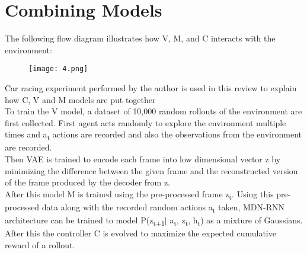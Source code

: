 \documentclass{article}
\begin{document}
\section{Combining Models}
The following flow diagram illustrates how V, M, and C interacts with the environment:
\begin{figure}[H]
  \texttt{[image: 4.png]}
\end{figure}
Car racing experiment performed by the author is used in this review to explain how C, V and M models are put together\\
To train the V model, a dataset of 10,000 random rollouts of the environment are first collected. First agent acts randomly to explore the environment multiple times and a\textsubscript{t} actions are recorded and also the observations from the environment are recorded.\\
Then VAE is trained to encode each frame into low dimensional vector z by minimizing the difference between the given frame and the reconstructed version of the frame produced by the decoder from z.\\
After this model M is trained using the pre-processed frame z\textsubscript{t}. Using this pre-processed data along with the recorded random actions a\textsubscript{t} taken, MDN-RNN architecture can be trained to model P(z\textsubscript{t+1}$\vert$ a\textsubscript{t}, z\textsubscript{t}, h\textsubscript{t}) as a mixture of Gaussians.\\
After this the controller C is evolved to maximize the expected cumulative reward of a rollout.
\end{document}
